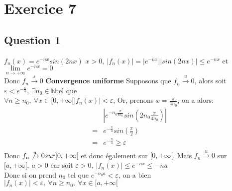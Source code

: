 \documentclass[td5.tex]{subfiles}
\begin{document}
\section{Exercice 7}
\subsection{Question 1}
$f_n(x) = e^{-nx}sin(2nx)$
$x > 0,~ |f_n(x)| = |e^{-nx}||sin(2nx)| \leq e^{-nx}$ et $\lim\limits_{n \to + \infty} e^{-nx} = 0$ \\
Donc $f_n \xrightarrow{s} 0$
\textbf{Convergence uniforme}
Supposons que $f_n \xrightarrow{u} 0$, alors soit $\varepsilon < e^{-\frac{\pi}{4}},~\exists n_0 \in \mathbb{N}$tel que \\
$\forall n \geq n_0,~\forall x \in [0, +\infty[ |f_n(x)| < \varepsilon$,
Or, prenons $x = \frac{\pi}{4n_0}$, on a alors: \\
\begin{align*}
  &|e^{-n_0 \frac{\pi}{4n_0}} sin(2n_0 \frac{\pi}{4n_0})| \\
  = &e^{- \frac{\pi}{4}} sin(\frac{\pi}{2})\\
  = &e^{- \frac{\pi}{4}} \geq \varepsilon \\
\end{align*}
Donc $f_n \not\xrightarrow{u} 0 sur ]0, +\infty[$ et donc également sur $[0, +\infty[$.
Mais $f_n \xrightarrow{u} 0$ sur $[a, +\infty[,~a > 0$
car soit $\varepsilon > 0,~|f_n(x)| \leq e^{-nx} \leq {-na}$ \\
Donc si on prend $n_0$ tel que $e^{-n_0 a} < \varepsilon$,
on a bien $|f_n(x)| < \varepsilon,~\forall n\geq n_0,~\forall x \in [a, +\infty[$
\end{document}
